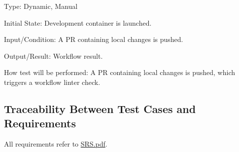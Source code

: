 \documentclass[12pt, titlepage]{article}
\begin{document}
\begin{enumerate}
\begin{enumerate}
Type: Dynamic, Manual
					
Initial State: Development container is launched.
					
Input/Condition: A PR containing local changes is pushed.
					
Output/Result: Workflow result.
					
How test will be performed: A PR containing local changes is pushed, which triggers a workflow linter check.
\end{enumerate}
\subsection{Traceability Between Test Cases and Requirements}
All requirements refer to \href{https://github.com/wangq131/4G06CapstoneProjectT5/blob/689841fefc298f80d84232996e1c7ca7981dd93d/docs/SRS/SRS.pdf}{SRS.pdf}.



\end{enumerate}
\end{document}
